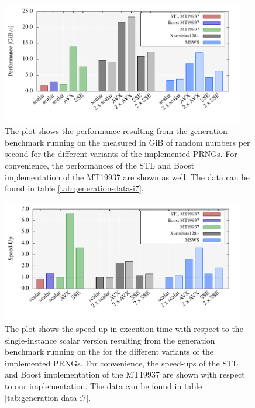 \documentclass{stdlocal}
\begin{document}
    \begin{figure}
      \center
      \includegraphics[width=0.95\textwidth]{plots/generation_desktop.pdf}
      \caption[Generation Benchmark Performance for ]{%
        The plot shows the performance resulting from the generation benchmark running on the  measured in $\mathrm{GiB}$ of random numbers per second for the different variants of the implemented PRNGs.
        For convenience, the performances of the STL and Boost implementation of the MT19937 are shown as well.
        The data can be found in table \ref{tab:generation-data-i7}.
      }
      \label{fig:generation-performance-i7}
    \end{figure}

    \begin{figure}
      \center
      \includegraphics[width=0.95\textwidth]{plots/generation_desktop_speedup.pdf}
      \caption[Generation Benchmark Speed-Up for ]{%
        The plot shows the speed-up in execution time with respect to the single-instance scalar version resulting from the generation benchmark running on the  for the different variants of the implemented PRNGs.
        For convenience, the speed-ups of the STL and Boost implementation of the MT19937 are shown with respect to our implementation.
        The data can be found in table \ref{tab:generation-data-i7}.
      }
      \label{fig:generation-speedup-i7}
    \end{figure}
\end{document}
